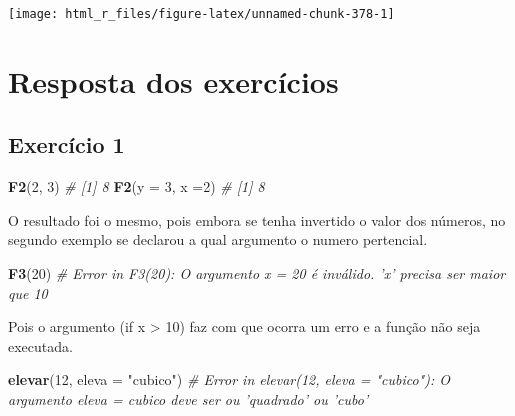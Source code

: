 \documentclass[
]{book}
\newenvironment{Shaded}{\begin{snugshade}}{\end{snugshade}}
\newcommand{\CommentTok}[1]{\textcolor[rgb]{0.56,0.35,0.01}{\textit{#1}}}
\newcommand{\DataTypeTok}[1]{\textcolor[rgb]{0.13,0.29,0.53}{#1}}
\newcommand{\DecValTok}[1]{\textcolor[rgb]{0.00,0.00,0.81}{#1}}
\newcommand{\KeywordTok}[1]{\textcolor[rgb]{0.13,0.29,0.53}{\textbf{#1}}}
\newcommand{\NormalTok}[1]{#1}
\newcommand{\StringTok}[1]{\textcolor[rgb]{0.31,0.60,0.02}{#1}}
\begin{document}
\begin{center}\texttt{[image: html\_r\_files/figure-latex/unnamed-chunk-378-1]} \end{center}

\hypertarget{appendix-apuxeandices}{%
\appendix}


\hypertarget{resposta-dos-exercuxedcios}{%
\chapter{Resposta dos exercícios}\label{resposta-dos-exercuxedcios}}

\hypertarget{exerc1}{%
\section{Exercício 1}\label{exerc1}}

\begin{Shaded}
\begin{Highlighting}[]
\KeywordTok{F2}\NormalTok{(}\DecValTok{2}\NormalTok{, }\DecValTok{3}\NormalTok{)}
\CommentTok{# [1] 8}
\KeywordTok{F2}\NormalTok{(}\DataTypeTok{y =} \DecValTok{3}\NormalTok{, }\DataTypeTok{x =}\DecValTok{2}\NormalTok{)}
\CommentTok{# [1] 8}
\end{Highlighting}
\end{Shaded}

O resultado foi o mesmo, pois embora se tenha invertido o valor dos números, no segundo exemplo se declarou a qual argumento o numero pertencial.

\begin{Shaded}
\begin{Highlighting}[]
\KeywordTok{F3}\NormalTok{(}\DecValTok{20}\NormalTok{)}
\CommentTok{# Error in F3(20): O argumento x = 20 é inválido. 'x' precisa ser maior que 10}
\end{Highlighting}
\end{Shaded}

Pois o argumento (if x \textgreater{} 10) faz com que ocorra um erro e a função não seja executada.

\begin{Shaded}
\begin{Highlighting}[]
\KeywordTok{elevar}\NormalTok{(}\DecValTok{12}\NormalTok{, }\DataTypeTok{eleva =} \StringTok{"cubico"}\NormalTok{)}
\CommentTok{# Error in elevar(12, eleva = "cubico"): O argumento eleva = cubico deve ser ou 'quadrado' ou 'cubo'}
\end{Highlighting}
\end{Shaded}
\end{document}
